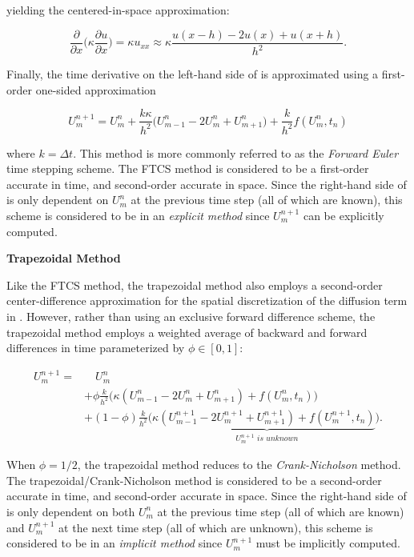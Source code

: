 yielding the centered-in-space approximation:

\begin{equation}
    \frac{\partial}{\partial x}\big(\kappa \frac{\partial u}{\partial x}\big) = \kappa u_{xx} \approx \kappa \frac{u(x-h) - 2u(x) + u(x+h)}{h^2}. 
\end{equation}


Finally, the time derivative on the left-hand side of  is approximated using a first-order one-sided approximation

\begin{equation}\label{eq:ftcs}
    U_{m}^{n+1} = U_{m}^{n} + \frac{k \kappa}{h^2}\big(U_{m-1}^{n} - 2 U_{m}^{n} + U_{m+1}^{n}\big) + \frac{k}{h^2}f(U_m^n, t_n) 
\end{equation}

where $k = \Delta t$. This method is more commonly referred to as the \textit{Forward Euler} time stepping scheme. The FTCS method is considered to be a first-order accurate in time, and second-order accurate in space. Since the right-hand side of  is only dependent on $U_m^{n}$ at the previous time step (all of which are known), this scheme is considered to be in an \textit{explicit method} since $U_m^{n+1}$ can be explicitly computed. 

\vspace{0.5cm}
\noindent\textbf{Trapezoidal Method}

Like the FTCS method, the trapezoidal method also employs a second-order center-difference approximation for the spatial discretization of the diffusion term in . However, rather than using an exclusive forward difference scheme, the trapezoidal method employs a weighted average of backward and forward differences in time parameterized by $\phi \in [0, 1]$: 

\begin{equation}
\begin{aligned}
U_m^{n+1} = & \quad U_m^n \\
&+ \phi \frac{k}{h^2} \bigg(\kappa (U_{m-1}^{n} - 2U_{m}^{n} + U_{m+1}^{n}) + f(U_{m}^{n}, t_n) \bigg)\\
&+ (1-\phi) \frac{k}{h^2} \bigg(\kappa\underbrace{(U_{m-1}^{n+1} - 2U_{m}^{n+1} + U_{m+1}^{n+1}) + f(U_{m}^{n+1}, t_n)}_{U_m^{n+1} \textit{ is unknown}}\bigg).
\end{aligned}
\end{equation}

When $\phi=1/2$, the trapezoidal method reduces to the \textit{Crank-Nicholson} method. The trapezoidal/Crank-Nicholson method is considered to be a second-order accurate in time, and second-order accurate in space. Since the right-hand side of  is only dependent on both $U_m^{n}$ at the previous time step (all of which are known) and $U_m^{n+1}$ at the next time step (all of which are unknown), this scheme is considered to be in an \textit{implicit method} since $U_m^{n+1}$ must be implicitly computed. 

